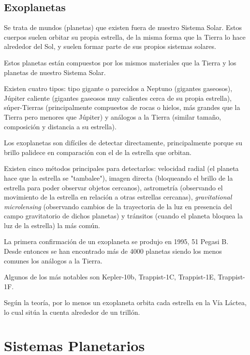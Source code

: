 \documentclass{tufte-handout}
\begin{document}
\subsection{Exoplanetas}

Se trata de mundos (planetas) que existen fuera de nuestro Sistema Solar. Estos cuerpos suelen orbitar su propia estrella, de la misma forma que la Tierra lo hace alrededor del Sol, y suelen formar parte de sus propios sistemas solares.

Estos planetas están compuestos por los mismos materiales que la Tierra y los planetas de nuestro Sistema Solar.

Existen cuatro tipos: tipo gigante o parecidos a Neptuno (gigantes gaseosos), Júpiter caliente (gigantes gaseosos muy calientes cerca de su propia estrella), súper-Tierras (principalmente compuestos de rocas o hielos, más grandes que la Tierra pero menores que Júpiter) y análogos a la Tierra (similar tamaño, composición y distancia a su estrella).

Los exoplanetas son difíciles de detectar directamente, principalmente porque su brillo palidece en comparación con el de la estrella que orbitan.

Existen cinco métodos principales para detectarlos: velocidad radial (el planeta hace que la estrella se "tambalee"), imagen directa (bloqueando el brillo de la estrella para poder observar objetos cercanos), astrometría (observando el movimiento de la estrella en relación a otras estrellas cercanas), \emph{gravitational microlensing} (observando cambios de la trayectoria de la luz en presencia del campo gravitatorio de dichos planetas) y tránsitos (cuando el planeta bloquea la luz de la estrella) la más común.

La primera confirmación de un exoplaneta se produjo en 1995, 51 Pegasi B. Desde entonces se han encontrado más de 4000 planetas siendo los menos comunes los análogos a la Tierra.

Algunos de los más notables son Kepler-10b, Trappist-1C, Trappist-1E, Trappist-1F.

Según la teoría, por lo menos un exoplaneta orbita cada estrella en la Vía Láctea, lo cual sitúa la cuenta alrededor de un trillón.

\clearpage

\section{Sistemas Planetarios}

\clearpage
\end{document}
